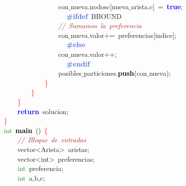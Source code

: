 \mbox{}\ \ \ \ \ \ \ \ \ \ \ \ \ \ \ \ con$\_$nueva\textcolor{BrickRed}{.}nodosc\textcolor{BrickRed}{[}nueva$\_$arista\textcolor{BrickRed}{.}c\textcolor{BrickRed}{]}\ \textcolor{BrickRed}{=}\ \textbf{\textcolor{Blue}{true}}\textcolor{BrickRed}{;} \\
\mbox{}\textbf{\textcolor{RoyalBlue}{\ \ \ \ \ \ \ \ \ \ \ \ \ \ \ \ \#ifdef}}\ BBOUND \\
\mbox{}\ \ \ \ \ \ \ \ \ \ \ \ \ \ \ \ \textit{\textcolor{Brown}{//\ Sumamos\ la\ preferencia}} \\
\mbox{}\ \ \ \ \ \ \ \ \ \ \ \ \ \ \ \ con$\_$nueva\textcolor{BrickRed}{.}valor\textcolor{BrickRed}{+=}\ preferencias\textcolor{BrickRed}{[}indice\textcolor{BrickRed}{];} \\
\mbox{}\textbf{\textcolor{RoyalBlue}{\ \ \ \ \ \ \ \ \ \ \ \ \ \ \ \ \#else}} \\
\mbox{}\ \ \ \ \ \ \ \ \ \ \ \ \ \ \ \ con$\_$nueva\textcolor{BrickRed}{.}valor\textcolor{BrickRed}{++;} \\
\mbox{}\textbf{\textcolor{RoyalBlue}{\ \ \ \ \ \ \ \ \ \ \ \ \ \ \ \ \#endif}} \\
\mbox{}\ \ \ \ \ \ \ \ \ \ \ \ \ \ \ \ posibles$\_$particiones\textcolor{BrickRed}{.}\textbf{\textcolor{Black}{push}}\textcolor{BrickRed}{(}con$\_$nueva\textcolor{BrickRed}{);} \\
\mbox{}\ \ \ \ \ \ \ \ \ \ \ \ \textcolor{Red}{\}} \\
\mbox{}\ \ \ \ \ \ \ \ \textcolor{Red}{\}} \\
\mbox{}\ \ \ \ \textcolor{Red}{\}} \\
\mbox{}\ \ \ \ \textbf{\textcolor{Blue}{return}}\ solucion\textcolor{BrickRed}{;} \\
\mbox{}\textcolor{Red}{\}} \\
\mbox{}\textcolor{ForestGreen}{int}\ \textbf{\textcolor{Black}{main}}\ \textcolor{BrickRed}{()}\ \textcolor{Red}{\{} \\
\mbox{}\ \ \ \ \textit{\textcolor{Brown}{//\ Bloque\ de\ entradas}} \\
\mbox{}\ \ \ \ \textcolor{TealBlue}{vector\textless{}Arista\textgreater{}}\ aristas\textcolor{BrickRed}{;} \\
\mbox{}\ \ \ \ \textcolor{TealBlue}{vector\textless{}int\textgreater{}}\ preferencias\textcolor{BrickRed}{;} \\
\mbox{}\ \ \ \ \textcolor{ForestGreen}{int}\ preferencia\textcolor{BrickRed}{;} \\
\mbox{}\ \ \ \ \textcolor{ForestGreen}{int}\ a\textcolor{BrickRed}{,}b\textcolor{BrickRed}{,}c\textcolor{BrickRed}{;} \\

